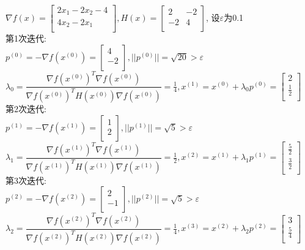 \begin{solution}
    $\nabla f(x)=\begin{bmatrix}
        2x_1-2x_2-4  \\
        4x_2-2x_1  \\
    \end{bmatrix}, H(x)=\begin{bmatrix}
        2   & -2  \\
        -2  & 4  \\
    \end{bmatrix}$,
    设$\varepsilon$为0.1\\
第1次迭代:\\
$p^{(0)}=-\nabla f(x^{(0)})=\begin{bmatrix} 4\\-2\\\end{bmatrix},||p^{(0)}||=\sqrt{20}>\varepsilon$\\
$\lambda_0=\dfrac{\nabla f(x^{(0)})^T\nabla f(x^{(0)})}{\nabla f(x^{(0)})^TH(x^{(0)})\nabla f(x^{(0)})}=\frac{1}{4},x^{(1)}=x^{(0)}+\lambda_0p^{(0)}=\begin{bmatrix} 2\\\frac{1}{2}\\\end{bmatrix}$\\
第2次迭代:\\
$p^{(1)}=-\nabla f(x^{(1)})=\begin{bmatrix} 1\\2\\\end{bmatrix},||p^{(1)}||=\sqrt{5}>\varepsilon$\\
$\lambda_1=\dfrac{\nabla f(x^{(1)})^T\nabla f(x^{(1)})}{\nabla f(x^{(1)})^TH(x^{(1)})\nabla f(x^{(1)})}=\frac{1}{2},x^{(2)}=x^{(1)}+\lambda_1p^{(1)}=\begin{bmatrix} \frac{5}{2}\\\frac{3}{2}\\\end{bmatrix}$\\
第3次迭代:\\
$p^{(2)}=-\nabla f(x^{(2)})=\begin{bmatrix} 2\\-1\\\end{bmatrix},||p^{(2)}||=\sqrt{5}>\varepsilon$\\
$\lambda_2=\dfrac{\nabla f(x^{(2)})^T\nabla f(x^{(2)})}{\nabla f(x^{(2)})^TH(x^{(2)})\nabla f(x^{(2)})}=\frac{1}{4},x^{(3)}=x^{(2)}+\lambda_2p^{(2)}=\begin{bmatrix} 3\\\frac{5}{4}\\\end{bmatrix}$\\

\end{solution}
